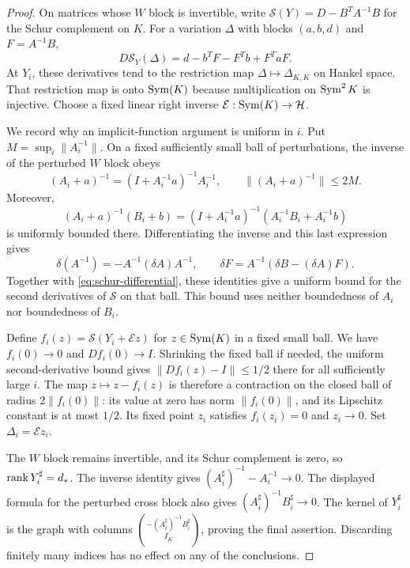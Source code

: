 \begin{proof}
On matrices whose $W$ block is invertible, write
$\mathcal S(Y)=D-B^TA^{-1}B$ for the Schur complement on $K$.
For a variation $\Delta$ with blocks $(a,b,d)$ and $F=A^{-1}B$,
\begin{equation}
\label{eq:schur-differential}
 D\mathcal S_Y(\Delta)
   =d-b^TF-F^Tb+F^TaF.
\end{equation}
At $Y_i$, these derivatives tend to the restriction map
$\Delta\mapsto\Delta_{K,K}$ on Hankel space. That restriction map
is onto $\operatorname{Sym}(K)$ because multiplication on $\operatorname{Sym}^2K$ is injective.
Choose a fixed linear right inverse
$\mathcal E:\operatorname{Sym}(K)\to\mathcal H$.

We record why an implicit-function argument is uniform in $i$.
Put $M=\sup_i\|A_i^{-1}\|$. On a fixed sufficiently small ball of
perturbations, the inverse of the perturbed $W$ block obeys
\[
 (A_i+a)^{-1}=(I+A_i^{-1}a)^{-1}A_i^{-1},
 \qquad \|(A_i+a)^{-1}\|\le2M.
\]
Moreover,
\[
 (A_i+a)^{-1}(B_i+b)
   =(I+A_i^{-1}a)^{-1}(A_i^{-1}B_i+A_i^{-1}b)
\]
is uniformly bounded there. Differentiating the inverse and this
last expression gives
\[
 \delta(A^{-1})=-A^{-1}(\delta A)A^{-1},
 \qquad
 \delta F=A^{-1}(\delta B-(\delta A)F).
\]
Together with \eqref{eq:schur-differential}, these identities give a
uniform bound for the second derivatives of $\mathcal S$ on that
ball. This bound uses neither boundedness of $A_i$ nor boundedness
of $B_i$.

Define $f_i(z)=\mathcal S(Y_i+\mathcal E z)$ for
$z\in\operatorname{Sym}(K)$ in a fixed small ball. We have $f_i(0)\to0$ and
$Df_i(0)\to I$. Shrinking the fixed ball if needed, the uniform
second-derivative bound gives
$\|Df_i(z)-I\|\le1/2$ there for all sufficiently large $i$.
The map $z\mapsto z-f_i(z)$ is therefore a contraction on the
closed ball of radius $2\|f_i(0)\|$: its value at zero has norm
$\|f_i(0)\|$, and its Lipschitz constant is at most $1/2$.
Its fixed point $z_i$ satisfies $f_i(z_i)=0$ and $z_i\to0$.
Set $\Delta_i=\mathcal E z_i$.

The $W$ block remains invertible, and its Schur complement is zero,
so $\operatorname{rank} Y_i^\sharp=d_*$. The inverse identity gives
$(A_i^\sharp)^{-1}-A_i^{-1}\to0$. The displayed formula for the
perturbed cross block also gives
$(A_i^\sharp)^{-1}B_i^\sharp\to0$. The kernel of $Y_i^\sharp$ is
the graph with columns
$\binom{-(A_i^\sharp)^{-1}B_i^\sharp}{I_K}$, proving the final
assertion. Discarding finitely many indices has no effect on any
of the conclusions.
\end{proof}

